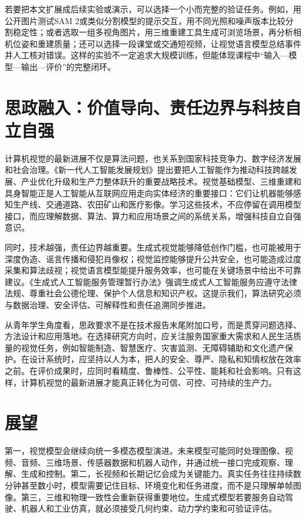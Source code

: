 \documentclass[UTF8,a4paper,12pt]{ctexart}
\newcommand{\model}[1]{\textsf{#1}}
\begin{document}
若要把本文扩展成后续实验或演示，可以选择一个小而完整的验证任务。例如，用公开图片测试\model{SAM 2}或类似分割模型的提示交互，用不同光照和噪声版本比较分割稳定性；或者选取一组多视角图片，用三维重建工具生成可浏览场景，再分析相机位姿和重建质量；还可以选择一段课堂或交通短视频，让视觉语言模型总结事件并人工核对错误。这样的实验不一定追求大规模训练，但能体现课程中“输入—模型—输出—评价”的完整闭环。

\section{思政融入：价值导向、责任边界与科技自立自强}
计算机视觉的最新进展不仅是算法问题，也关系到国家科技竞争力、数字经济发展和社会治理。《新一代人工智能发展规划》提出要把人工智能作为推动科技跨越发展、产业优化升级和生产力整体跃升的重要战略技术\cite{aiplan}。视觉基础模型、三维重建和具身智能正是人工智能从互联网应用走向实体经济的重要接口：它们让机器能够感知生产线、交通道路、农田矿山和医疗影像。学习这些技术，不应停留在调用模型接口，而应理解数据、算法、算力和应用场景之间的系统关系，增强科技自立自强意识。

同时，技术越强，责任边界越重要。生成式视觉能够降低创作门槛，也可能被用于深度伪造、谣言传播和侵犯肖像权；视觉监控能够提升公共安全，也可能造成过度采集和算法歧视；视觉语言模型能提升服务效率，也可能在关键场景中给出不可靠建议。《生成式人工智能服务管理暂行办法》强调生成式人工智能服务应遵守法律法规、尊重社会公德伦理、保护个人信息和知识产权\cite{genai2023}。这提示我们，算法研究必须与数据治理、安全评估、可解释性和责任追溯同步推进。

从青年学生角度看，思政要求不是在技术报告末尾附加口号，而是贯穿问题选择、方法设计和应用落地。在选择研究方向时，应关注服务国家重大需求和人民生活质量的视觉任务，例如智能制造、智慧医疗、灾害监测、无障碍辅助和文化遗产保护。在设计系统时，应坚持以人为本，把人的安全、尊严、隐私和知情权放在效率之前。在评价成果时，应同时看精度、鲁棒性、公平性、能耗和社会影响。只有这样，计算机视觉的最新进展才能真正转化为可信、可控、可持续的生产力。

\section{展望}
第一，视觉模型会继续向统一多模态模型演进。未来模型可能同时处理图像、视频、音频、三维场景、传感器数据和机器人动作，并通过统一接口完成观察、理解、生成和控制。第二，长视频和长期记忆会成为关键能力。真实任务往往持续数分钟甚至数小时，模型需要记住目标、环境变化和任务进度，而不是只理解单帧图像。第三，三维和物理一致性会重新获得重要地位。生成式模型若要服务自动驾驶、机器人和工业仿真，就必须接受几何约束、动力学约束和可验证评估。
\end{document}
